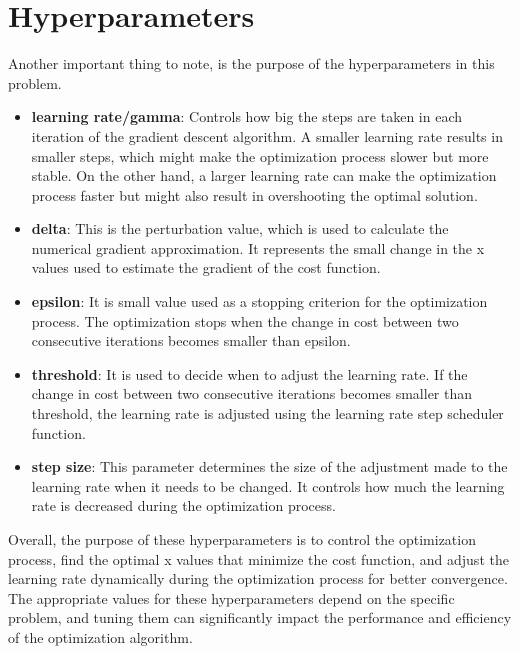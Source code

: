\documentclass[inscr,ack,preface]{diphdthesis}
\begin{document}
\section{Hyperparameters}

Another important thing to note, is the purpose of the hyperparameters in this problem. 

\begin{itemize}
    \item \textbf{learning rate/gamma}: Controls how big the steps are taken in each iteration of the gradient descent algorithm. A smaller learning rate results in smaller steps, which might make the optimization process slower but more stable. On the other hand, a larger learning rate can make the optimization process faster but might also result in overshooting the optimal solution.

    \item \textbf{delta}: This is the perturbation value, which is used to calculate the numerical gradient approximation. It represents the small change in the x values used to estimate the gradient of the cost function.
    
    \item \textbf{epsilon}: It is small value used as a stopping criterion for the optimization process. The optimization stops when the change in cost between two consecutive iterations becomes smaller than epsilon.
    
    \item \textbf{threshold}: It is used to decide when to adjust the learning rate. If the change in cost between two consecutive iterations becomes smaller than threshold, the learning rate is adjusted using the learning rate step scheduler function.
    
    \item \textbf{step size}: This parameter determines the size of the adjustment made to the learning rate when it needs to be changed. It controls how much the learning rate is decreased during the optimization process.
    
\end{itemize}

Overall, the purpose of these hyperparameters is to control the optimization process, find the optimal x values that minimize the cost function, and adjust the learning rate dynamically during the optimization process for better convergence. The appropriate values for these hyperparameters depend on the specific problem, and tuning them can significantly impact the performance and efficiency of the optimization algorithm.
\end{document}
